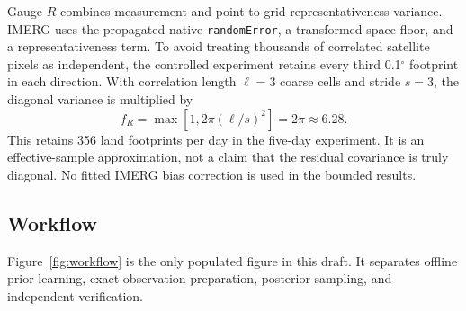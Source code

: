 \documentclass[10pt,twocolumn]{article}
\begin{document}
Gauge $R$ combines measurement and point-to-grid representativeness variance. IMERG uses the propagated native \texttt{randomError}, a transformed-space floor, and a representativeness term. To avoid treating thousands of correlated satellite pixels as independent, the controlled experiment retains every third 0.1$^\circ$ footprint in each direction. With correlation length $\ell=3$ coarse cells and stride $s=3$, the diagonal variance is multiplied by
\begin{equation}
 f_R=\max\left[1,2\pi(\ell/s)^2\right]=2\pi\approx6.28.
 \label{eq:rinflate}
\end{equation}
This retains 356 land footprints per day in the five-day experiment. It is an effective-sample approximation, not a claim that the residual covariance is truly diagonal. No fitted IMERG bias correction is used in the bounded results.

\subsection{Workflow}

Figure~\ref{fig:workflow} is the only populated figure in this draft. It separates offline prior learning, exact observation preparation, posterior sampling, and independent verification.
\end{document}

